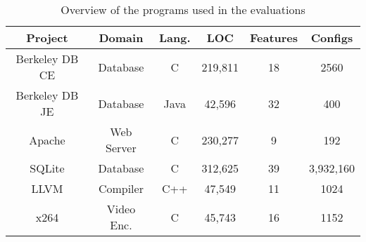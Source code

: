 \documentclass{sig-alternative}
\begin{document}
 \begin{table*}[!h]
 
 \begin{tabular}{c c c c c c} 

 
 \hline
 Project & Domain & Lang. & LOC & Features & Configs \\  
 \hline
 Berkeley DB CE & Database & C & 219,811 & 18 & 2560  \\ 
 
 Berkeley DB JE & Database & Java & 42,596 & 32 & 400 \\

 Apache & Web Server & C & 230,277 & 9 & 192 \\

 SQLite & Database & C & 312,625 & 39 & 3,932,160 \\
 
 LLVM & Compiler & C++ & 47,549 & 11 & 1024 \\ 

 x264 & Video Enc. & C & 45,743 & 16 & 1152 \\ 

\end{tabular}
 \caption{Overview of the programs used in the evaluations}
\end{table*}
\end{document}
